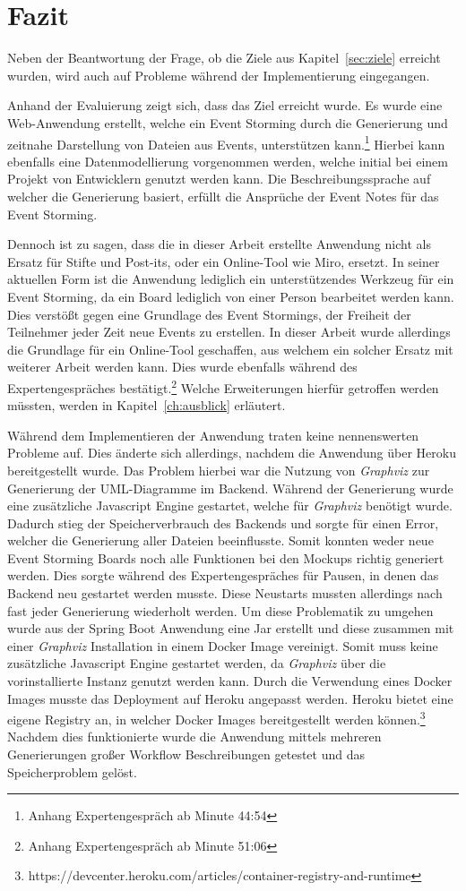 \chapter{Fazit}\label{ch:fazit}
Neben der Beantwortung der Frage, ob die Ziele aus Kapitel~\ref{sec:ziele} erreicht wurden, wird auch auf Probleme während
der Implementierung eingegangen.

Anhand der Evaluierung zeigt sich, dass das Ziel erreicht wurde.
Es wurde eine Web-Anwendung erstellt, welche ein Event Storming durch die Generierung und zeitnahe Darstellung von Dateien aus Events, unterstützen kann.\footnote{Anhang Expertengespräch ab Minute 44:54}
Hierbei kann ebenfalls eine Datenmodellierung vorgenommen werden, welche initial bei einem Projekt von Entwicklern genutzt werden kann.
Die Beschreibungssprache auf welcher die Generierung basiert, erfüllt die Ansprüche der Event Notes für das Event Storming.

Dennoch ist zu sagen, dass die in dieser Arbeit erstellte Anwendung nicht als Ersatz für Stifte und Post-its, oder ein Online-Tool wie Miro, ersetzt.
In seiner aktuellen Form ist die Anwendung lediglich ein unterstützendes Werkzeug für ein Event Storming, da ein Board lediglich von einer Person bearbeitet werden kann.
Dies verstößt gegen eine Grundlage des Event Stormings, der Freiheit der Teilnehmer jeder Zeit neue Events zu erstellen.
In dieser Arbeit wurde allerdings die Grundlage für ein Online-Tool geschaffen, aus welchem ein solcher Ersatz mit weiterer Arbeit werden kann.
Dies wurde ebenfalls während des Expertengespräches bestätigt.\footnote{Anhang Expertengespräch ab Minute 51:06}
Welche Erweiterungen hierfür getroffen werden müssten, werden in Kapitel~\ref{ch:ausblick} erläutert.

Während dem Implementieren der Anwendung traten keine nennenswerten Probleme auf.
Dies änderte sich allerdings, nachdem die Anwendung über Heroku bereitgestellt wurde.
Das Problem hierbei war die Nutzung von \textit{Graphviz} zur Generierung der UML-Diagramme im Backend.
Während der Generierung wurde eine zusätzliche Javascript Engine gestartet, welche für \textit{Graphviz} benötigt wurde.
Dadurch stieg der Speicherverbrauch des Backends und sorgte für einen Error, welcher die Generierung aller Dateien beeinflusste.
Somit konnten weder neue Event Storming Boards noch alle Funktionen bei den Mockups richtig generiert werden.
Dies sorgte während des Expertengespräches für Pausen, in denen das Backend neu gestartet werden musste.
Diese Neustarts mussten allerdings nach fast jeder Generierung wiederholt werden.
Um diese Problematik zu umgehen wurde aus der Spring Boot Anwendung eine Jar erstellt und diese zusammen mit einer \textit{Graphviz} Installation in einem Docker Image
vereinigt.\cite*{size-problem}
Somit muss keine zusätzliche Javascript Engine gestartet werden, da \textit{Graphviz} über die vorinstallierte Instanz genutzt werden kann.
Durch die Verwendung eines Docker Images musste das Deployment auf Heroku angepasst werden.
Heroku bietet eine eigene Registry an, in welcher Docker Images bereitgestellt werden können.\footnote{https://devcenter.heroku.com/articles/container-registry-and-runtime}
Nachdem dies funktionierte wurde die Anwendung mittels mehreren Generierungen großer Workflow Beschreibungen getestet und das Speicherproblem gelöst.
